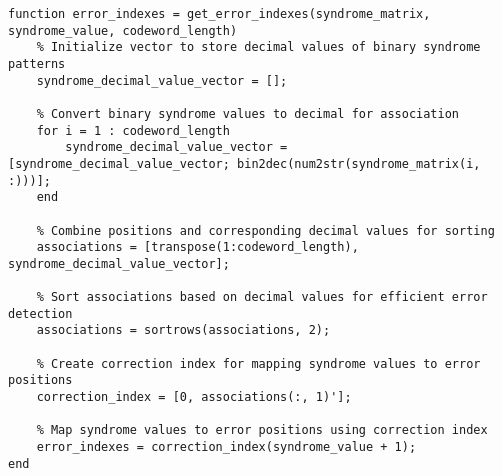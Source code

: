 \begin{lstlisting}
function error_indexes = get_error_indexes(syndrome_matrix, syndrome_value, codeword_length)
    % Initialize vector to store decimal values of binary syndrome patterns
    syndrome_decimal_value_vector = [];

    % Convert binary syndrome values to decimal for association
    for i = 1 : codeword_length
        syndrome_decimal_value_vector = [syndrome_decimal_value_vector; bin2dec(num2str(syndrome_matrix(i, :)))];
    end

    % Combine positions and corresponding decimal values for sorting
    associations = [transpose(1:codeword_length), syndrome_decimal_value_vector];

    % Sort associations based on decimal values for efficient error detection
    associations = sortrows(associations, 2);

    % Create correction index for mapping syndrome values to error positions
    correction_index = [0, associations(:, 1)'];

    % Map syndrome values to error positions using correction index
    error_indexes = correction_index(syndrome_value + 1);
end
\end{lstlisting}
